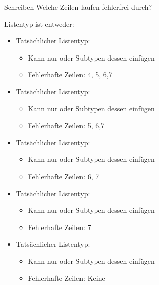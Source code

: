 \documentclass{../tuda-beamer}
\begin{document}
    \begin{frame}{Schreiben}
        Welche Zeilen laufen fehlerfrei durch?

        
    \end{frame}

    \begin{frame}[c]
        Listentyp ist entweder:

        \begin{itemize}
            \item Tatsächlicher Listentyp: 
            \begin{itemize}
                \item Kann nur  oder Subtypen dessen einfügen
                \item Fehlerhafte Zeilen: 4, 5, 6,7
            \end{itemize}
            \item Tatsächlicher Listentyp: 
            \begin{itemize}
                \item Kann nur  oder Subtypen dessen einfügen
                \item Fehlerhafte Zeilen: 5, 6,7
            \end{itemize}
            \item Tatsächlicher Listentyp: 
            \begin{itemize}
                \item Kann nur  oder Subtypen dessen einfügen
                \item Fehlerhafte Zeilen: 6, 7
            \end{itemize}
            \item Tatsächlicher Listentyp: 
            \begin{itemize}
                \item Kann nur  oder Subtypen dessen einfügen
                \item Fehlerhafte Zeilen: 7
            \end{itemize}
            \item Tatsächlicher Listentyp: 
            \begin{itemize}
                \item Kann nur  oder Subtypen dessen einfügen
                \item Fehlerhafte Zeilen: Keine
            \end{itemize}
        \end{itemize}
    \end{frame}
\end{document}

